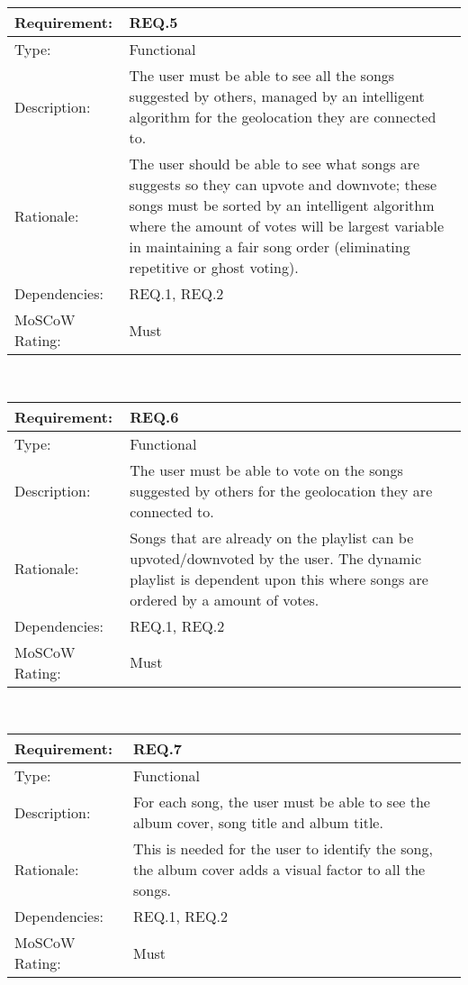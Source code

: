 \vspace{0.5cm}

\noindent
\begin{tabular}{|l || p{12.0cm}|}
  \hline
  Requirement:       & REQ.5 \\ \hline
  Type:              & Functional \\ \hline
  Description:       & The user must be able to see all the songs suggested by others, managed by an intelligent algorithm for the geolocation they are connected to.\\ \hline
  Rationale:         & The user should be able to see what songs are suggests so they can upvote and downvote; these songs must be sorted by an intelligent algorithm where the amount of votes will be largest variable in maintaining a fair song order (eliminating repetitive or ghost voting). \\ \hline
  Dependencies:      & REQ.1, REQ.2 \\ \hline
  MoSCoW Rating:     & Must \\
\hline
\end{tabular}\\

\vspace{0.5cm}

\noindent
\begin{tabular}{|l || p{12.0cm}|}
  \hline
  Requirement:       & REQ.6 \\ \hline
  Type:              & Functional \\ \hline
  Description:       & The user must be able to vote on the songs suggested by others for the geolocation they are connected to. \\ \hline
  Rationale:         & Songs that are already on the playlist can be upvoted/downvoted by the user. The dynamic playlist is dependent upon this where songs are ordered by a amount of votes. \\ \hline
  Dependencies:      & REQ.1, REQ.2 \\ \hline
  MoSCoW Rating:     & Must \\
\hline
\end{tabular}\\

\vspace{0.5cm}

\noindent
\begin{tabular}{|l || p{12.0cm}|}
  \hline
  Requirement:       & REQ.7 \\ \hline
  Type:              & Functional \\ \hline
  Description:       & For each song, the user must be able to see the album cover, song title and album title. \\ \hline
  Rationale:         & This is needed for the user to identify the song, the album cover adds a visual factor to all the songs. \\ \hline
  Dependencies:      & REQ.1, REQ.2 \\ \hline
  MoSCoW Rating:     & Must \\
\hline
\end{tabular}\\

